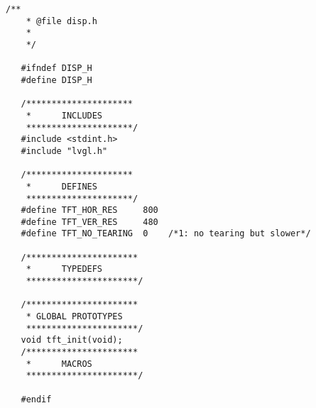 \begin{lstlisting}[captionpos=t, caption={Fichero \texttt{tft.h}}]
    /**
    * @file disp.h
    * 
    */
   
   #ifndef DISP_H
   #define DISP_H
   
   /*********************
    *      INCLUDES
    *********************/
   #include <stdint.h>
   #include "lvgl.h"
   
   /*********************
    *      DEFINES
    *********************/
   #define TFT_HOR_RES     800
   #define TFT_VER_RES     480
   #define TFT_NO_TEARING  0    /*1: no tearing but slower*/
   
   /**********************
    *      TYPEDEFS
    **********************/
   
   /**********************
    * GLOBAL PROTOTYPES
    **********************/
   void tft_init(void);
   /**********************
    *      MACROS
    **********************/
   
   #endif
   
\end{lstlisting}

